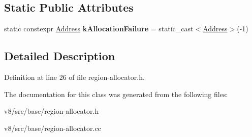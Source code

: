\subsection*{Static Public Attributes}
\begin{DoxyCompactItemize}
\item 
\mbox{\label{classv8_1_1base_1_1RegionAllocator_ad71f7237bc76ed36662935004f126f04}} 
static constexpr \mbox{\hyperlink{classuintptr__t}{Address}} {\bfseries k\+Allocation\+Failure} = static\+\_\+cast$<$\mbox{\hyperlink{classuintptr__t}{Address}}$>$(-\/1)
\end{DoxyCompactItemize}


\subsection{Detailed Description}


Definition at line 26 of file region-\/allocator.\+h.



The documentation for this class was generated from the following files\+:\begin{DoxyCompactItemize}
\item 
v8/src/base/region-\/allocator.\+h\item 
v8/src/base/region-\/allocator.\+cc\end{DoxyCompactItemize}
